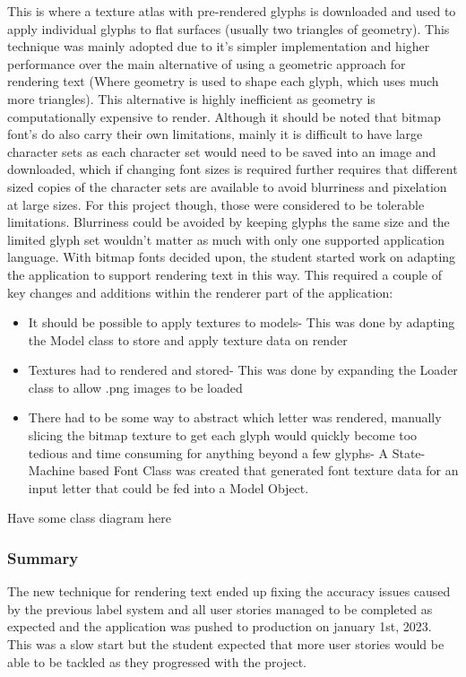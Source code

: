 This is where a texture atlas with pre-rendered glyphs is downloaded and used to apply individual glyphs to flat surfaces (usually two triangles of geometry). This technique was mainly adopted due to it's simpler implementation and higher performance over the main alternative of using a geometric approach for rendering text (Where geometry is used to shape each glyph, which uses much more triangles). This alternative is highly inefficient as geometry is computationally expensive to render. Although it should be noted that bitmap font's do also carry their own limitations, mainly it is difficult to have large character sets as each character set would need to be saved into an image and downloaded, which if changing font sizes is required further requires that different sized copies of the character sets are available to avoid blurriness and pixelation at large sizes.
For this project though, those were considered to be tolerable limitations. Blurriness could be avoided by keeping glyphs the same size and the limited glyph set wouldn't matter as much with only one supported application language.
With bitmap fonts decided upon, the student started work on adapting the application to support rendering text in this way. This required a couple of key changes and additions within the renderer part of the application:
\begin{itemize}
    \item It should be possible to apply textures to models- This was done by adapting the Model class to store and apply texture data on render
    \item Textures had to rendered and stored- This was done by expanding the Loader class to allow .png images to be loaded
    \item There had to be some way to abstract which letter was rendered, manually slicing the bitmap texture to get each glyph would quickly become too tedious and time consuming for anything beyond a few glyphs- A State-Machine based Font Class was created that generated font texture data for an input letter that could be fed into a Model Object.
\end{itemize}

Have some class diagram here

\subsubsection{Summary}
The new technique for rendering text ended up fixing the accuracy issues caused by the previous label system and all user stories managed to be completed as expected and the application was pushed to production on january 1st, 2023. This was a slow start but the student expected that more user stories would be able to be tackled as they progressed with the project.



